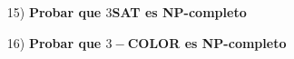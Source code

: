 \documentclass[12pt,a4paper]{article}
\begin{document}
\begin{itemize}
    \item [15)] \textbf{Probar que $3$SAT es NP-completo}
    \label{dem:3sat}
\end{itemize}


\begin{itemize}
    \item [16)] \textbf{Probar que $3-$COLOR es NP-completo}
    \label{dem:3color}
\end{itemize}
\end{document}
